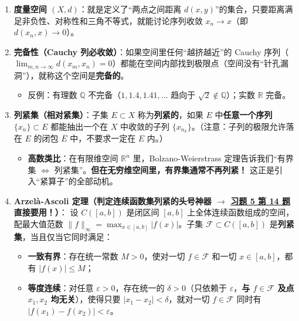 \documentclass[11pt,a4paper]{article}
\providecommand{\tightlist}{\setlength{\itemsep}{1.8pt}\setlength{\parskip}{0pt}}
\begin{document}
\begin{enumerate}
\def\labelenumi{\arabic{enumi}.}
\tightlist
\item
  \textbf{度量空间 \((X, d)\)}：就是定义了``两点之间距离 \(d(x, y)\)''的集合，只要距离满足非负性、对称性和三角不等式，就能讨论序列收敛 \(x_n \to x\)（即 \(d(x_n, x) \to 0\)）。
\item
  \textbf{完备性（Cauchy 列必收敛）}：如果空间里任何``越挤越近''的 Cauchy 序列（\(\lim_{m,n\to\infty} d(x_m, x_n) = 0\)）都能在空间内部找到极限点（空间没有``针孔漏洞''），就称这个空间是\textbf{完备的}。

  \begin{itemize}
  \tightlist
  \item
    反例：有理数 \(\mathbb{Q}\) 不完备（\(1, 1.4, 1.41, \dots\) 趋向于 \(\sqrt{2} \notin \mathbb{Q}\)）；实数 \(\mathbb{R}\) 完备。
  \end{itemize}
\item
  \textbf{列紧集（相对紧集）}：子集 \(E \subset X\) 称为\textbf{列紧的}，如果 \(E\) 中\textbf{任意一个序列} \(\{x_n\} \subset E\) 都能抽出一个在 \(X\) 中收敛的子列 \(\{x_{n_k}\}\)。（注意：子列的极限允许落在 \(E\) 的闭包 \(\overline{E}\) 中，不要求一定在 \(E\) 内。）

  \begin{itemize}
  \tightlist
  \item
    \textbf{高数类比}：在有限维空间 \(\mathbb{R}^n\) 里，Bolzano-Weierstrass 定理告诉我们``有界集 \(\iff\) 列紧集''。\textbf{但在无穷维空间里，有界集通常不再列紧！} 这正是引入``紧算子''的全部动机。
  \end{itemize}
\item
  \textbf{Arzelà-Ascoli 定理（判定连续函数集列紧的头号神器 \(\to\) \hyperlink{card:5-14}{\textcolor{LinkColor}{习题 5 第 14 题}}直接要用！）}： 设 \(C([a, b])\) 是闭区间 \([a, b]\) 上全体连续函数组成的空间，配最大值范数 \(\|f\|_\infty = \max_{x \in [a, b]} |f(x)|\)。子集 \(\mathcal{F} \subset C([a, b])\) 是\textbf{列紧集}，当且仅当它同时满足：

  \begin{itemize}
  \tightlist
  \item
    \textbf{一致有界}：存在统一常数 \(M > 0\)，使对一切 \(f \in \mathcal{F}\) 和一切 \(x \in [a, b]\)，都有 \(|f(x)| \le M\)；
  \item
    \textbf{等度连续}：对任意 \(\varepsilon > 0\)，存在统一的 \(\delta > 0\)（只依赖于 \(\varepsilon\)，\textbf{与 \(f \in \mathcal{F}\) 及点 \(x_1, x_2\) 均无关}），使得只要 \(|x_1 - x_2| < \delta\)，就对一切 \(f \in \mathcal{F}\) 同时有 \(|f(x_1) - f(x_2)| < \varepsilon\)。
  \end{itemize}
\end{enumerate}
\end{document}
